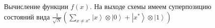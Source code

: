 \begin{figure}
\centering



\caption{Вычисление функции $f\left(x\right)$. На выходе схемы имеем
  суперпозицию  состояний вида 
$\frac{1}{\sqrt{N}}\left(
 \sum_{x \ne x^{\ast}} \left|x\right>\otimes\left|0\right>
+ \left|x^{\ast}\right>\otimes\left|1\right>
\right)$}
\label{figQuantCompGrover1}
\end{figure}

